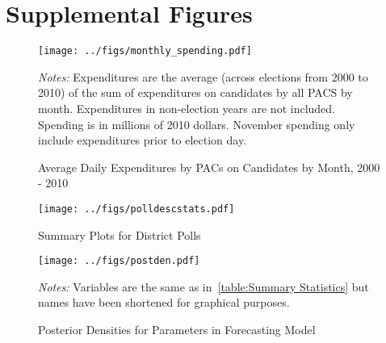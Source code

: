 \documentclass[12pt,final,fleqn]{article}
\theoremstyle{plain}
\begin{document}
\section{Supplemental Figures} \label{sec: Additional Figures 1}
\setcounter{figure}{0}

 \begin{figure}[!htb]
\centering
\texttt{[image: ../figs/monthly\_spending.pdf]}
\vspace{.5cm}
\caption{Average Daily Expenditures by PACs on Candidates by Month, 2000 - 2010}
\label{fig:Average Daily Expenditures by PACs on Candidates by Month, 2000 - 2010}
\begin{minipage}{\linewidth}
\footnotesize
\emph{Notes:} Expenditures are the average (across elections from 2000 to 2010) of the sum of expenditures on candidates by all PACS by month. Expenditures in non-election years are not included. Spending is in millions of 2010 dollars. November spending only include expenditures prior to election day. 
\end{minipage}
\end{figure}

\begin{figure}[!htb]
\centering
\texttt{[image: ../figs/polldescstats.pdf]}
\vspace{.5cm}
\caption{Summary Plots for District Polls}
\label{fig:Summary Plots for District Polls}
\end{figure} 

\begin{landscape}
\begin{figure}[!ht]
\texttt{[image: ../figs/postden.pdf]}
\vspace{.5cm}
\caption{Posterior Densities for Parameters in Forecasting Model}
\label{fig:Posterior Densities for Parameters in Forecasting Model}
\begin{minipage}{\linewidth}
\footnotesize
\emph{Notes:} Variables are the same as in~\autoref{table:Summary Statistics} but names have been shortened for graphical purposes. 
\end{minipage}
\end{figure}
\end{landscape}

\iffalse
\begin{figure}[!htb]
\texttt{[image: ../figs/pva.pdf]}
\vspace{.5cm}
\caption{In-Sample Predicted Versus Actual Plot, House Elections 1980 - 2008}
\label{fig:In-Sample Predicted Versus Actual Plot, House Elections 1980 - 2008}
\begin{minipage}{\linewidth}
\footnotesize
\emph{Notes:} Predicted value is the mean of the in-sample posterior predictive distribution ($v^{rep}$). Model parameters are estimated using data from 1980 to 2008. The blue line is a 45 degree line.
\end{minipage}
\end{figure}
\fi
\end{document}
